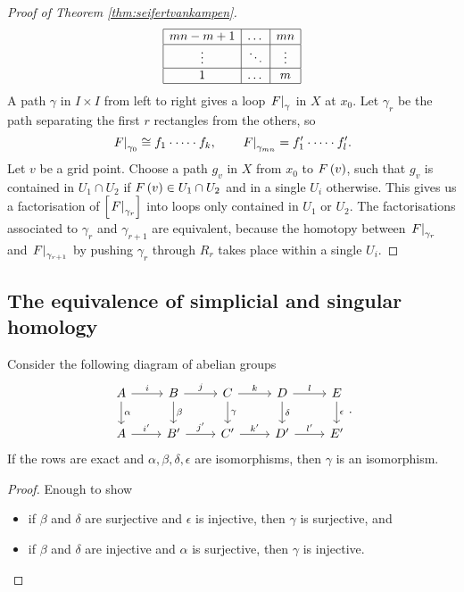 \begin{proof}[Proof of Theorem \ref{thm:seifertvankampen}]
$$\begin{array}{|c|c|c|}
\hline
mn - m + 1 & \dots & mn \\
\hline
\vdots & \ddots & \vdots \\
\hline
1 & \dots & m \\
\hline
\end{array}
$$
A path $ \gamma $ in $ I \times I $ from left to right gives a loop $ \left. F \right|_\gamma $ in $ X $ at $ x_0 $. Let $ \gamma_r $ be the path separating the first $ r $ rectangles from the others, so
$$ \left. F \right|_{\gamma_0} \cong f_1 \cdot \dots \cdot f_k, \qquad \left. F \right|_{\gamma_{mn}} = f_1' \cdot \dots \cdot f_l'. $$
Let $ v $ be a grid point. Choose a path $ g_v $ in $ X $ from $ x_0 $ to $ F\br{v} $, such that $ g_v $ is contained in $ U_1 \cap U_2 $ if $ F\br{v} \in U_1 \cap U_2 $ and in a single $ U_i $ otherwise. This gives us a factorisation of $ \sbr{\eval{F}_{\gamma_r}} $ into loops only contained in $ U_1 $ or $ U_2 $. The factorisations associated to $ \gamma_r $ and $ \gamma_{r + 1} $ are equivalent, because the homotopy between $ \left. F \right|_{\gamma_r} $ and $ \left. F \right|_{\gamma_{r + 1}} $ by pushing $ \gamma_r $ through $ R_r $ takes place within a single $ U_i $.
\end{proof}

\pagebreak

\subsection{The equivalence of simplicial and singular homology}

\begin{lemma}
Consider the following diagram of abelian groups
$$
\begin{tikzcd}
A \arrow{r}{i} \arrow{d}{\alpha} & B \arrow{r}{j} \arrow{d}{\beta} & C \arrow{r}{k} \arrow{d}{\gamma} & D \arrow{r}{l} \arrow{d}{\delta} & E \arrow{d}{\epsilon} \\
A \arrow{r}{i'} & B' \arrow{r}{j'} & C' \arrow{r}{k'} & D' \arrow{r}{l'} & E'
\end{tikzcd}.
$$
If the rows are exact and $ \alpha, \beta, \delta, \epsilon $ are isomorphisms, then $ \gamma $ is an isomorphism.
\end{lemma}

\begin{proof}
Enough to show
\begin{itemize}
\item if $ \beta $ and $ \delta $ are surjective and $ \epsilon $ is injective, then $ \gamma $ is surjective, and
\item if $ \beta $ and $ \delta $ are injective and $ \alpha $ is surjective, then $ \gamma $ is injective.
\end{itemize}
\end{proof}

